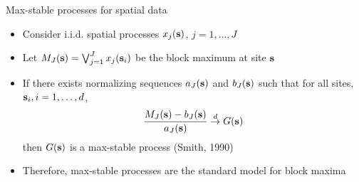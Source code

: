 \documentclass{beamer}
\begin{document}

\begin{frame}{Max-stable processes for spatial data}
  \begin{itemize} \setlength{\itemsep}{1em}
    \item Consider i.i.d. spatial processes $x_j(\mbox{\bf s})$, $j = 1, \ldots, J$
    \item Let $M_J(\mbox{\bf s}) = \bigvee_{j=1}^J x_j(\mbox{\bf s}_i)$ be the block maximum at site $\mbox{\bf s}$
    \item If there exists normalizing sequences $a_J(\mbox{\bf s})$ and $b_J(\mbox{\bf s})$ such that for all sites, $\mbox{\bf s}_i, i = 1, \ldots, d$,
    \begin{align*}
      \frac{M_J(\mbox{\bf s}) - b_J(\mbox{\bf s})}{a_J(\mbox{\bf s})} \stackrel{d}{\rightarrow} G(\mbox{\bf s})
    \end{align*}
    then $G(\mbox{\bf s})$ is a max-stable process (Smith, 1990)
    \item Therefore, max-stable processes are the standard model for block maxima
  \end{itemize}
\end{frame}
\end{document}
